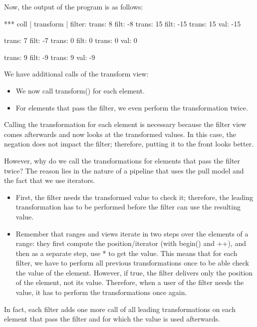 Now, the output of the program is as follows:

{\footnotesize
\begin{shell}
*** coll | transform | filter:
trans: 8
filt: -8
trans: 15
filt: -15
trans: 15
val: -15

trans: 7
filt: -7
trans: 0
filt: 0
trans: 0
val: 0

trans: 9
filt: -9
trans: 9
val: -9
\end{shell}
}

We have additional calls of the transform view:

\begin{itemize}
\item
We now call transform() for each element.

\item
For elements that pass the filter, we even perform the transformation twice.
\end{itemize}

Calling the transformation for each element is necessary because the filter view comes afterwards and now looks at the transformed values. In this case, the negation does not impact the filter; therefore, putting it to the front looks better.

However, why do we call the transformations for elements that pass the filter twice? The reason lies in the nature of a pipeline that uses the pull model and the fact that we use iterators.

\begin{itemize}
\item
First, the filter needs the transformed value to check it; therefore, the leading transformation has to be performed before the filter can use the resulting value.
	
\item
Remember that ranges and views iterate in two steps over the elements of a range: they first compute the position/iterator (with begin() and ++), and then as a separate step, use * to get the value. This means that for each filter, we have to perform all previous transformations once to be able check the value of the element. However, if true, the filter delivers only the position of the element, not its value. Therefore, when a user of the filter needs the value, it has to perform the transformations once again.
\end{itemize}

In fact, each filter adds one more call of all leading transformations on each element that pass the filter and for which the value is used afterwards.

